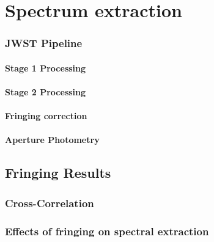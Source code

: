 \chapter{Spectrum extraction}
\subsection{JWST Pipeline}
\subsubsection{Stage 1 Processing}
\subsubsection{Stage 2 Processing}
\subsubsection{Fringing correction}
\subsubsection{Aperture Photometry}
\section{Fringing Results}
\subsection{Cross-Correlation}
\subsection{Effects of fringing on spectral extraction}